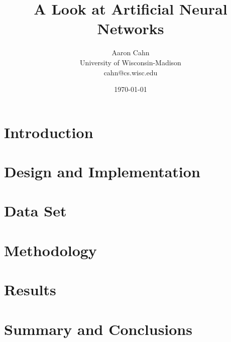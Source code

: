 \documentclass[12pt,twocolumn]{article}
\begin{document}
\title{A Look at Artificial Neural Networks}
\date{\today}



\author{
Aaron Cahn\\
University of Wisconsin-Madison\\
cahn@cs.wisc.edu
}


\maketitle
\begin{abstract}

\end{abstract}

\section{Introduction} \label{sec:intro} 
\section{Design and Implementation} \label{sec:design} 
\section{Data Set} \label{sec:data} 
\section{Methodology} \label{sec:methodology} 
\section{Results} \label{sec:results} 
\section{Summary and Conclusions} \label{sec:summary} 



\end{document}
